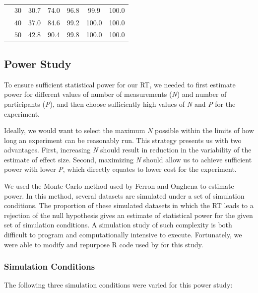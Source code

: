 \documentclass[empirical,issue, twocolumn,authordate]{jote-new-article}
\begin{document}
\begin{table}[t!]
\begin{fullwidth}
\begin{tabular}{@{}p{4\smallwidth} p{4\smallwidth} S  S  S  S  S @{}}
& $30$                                                             & 30.7      & 74.0     & 96.8     & 99.9      & 100.0     \\
& $40$                                                              & 37.0      & 84.6     & 99.2     & 100.0     & 100.0     \\
& $50$                                                              & 42.8      & 90.4     & 99.8     & 100.0     & 100.0  
\bottomrule
\end{tabular}
\end{fullwidth}

\end{table}
\subsection{Power Study}

To ensure sufficient statistical power for our RT, we needed to first estimate power for different values of number of measurements (\emph{N}) and number of participants (\emph{P}), and then choose sufficiently high values of \emph{N} and \emph{P} for the experiment. 

Ideally, we would want to select the maximum \emph{N} possible within the limits of how long an experiment can be reasonably run. This strategy presents us with two advantages. First, increasing \emph{N} should result in reduction in the variability of the estimate of effect size. Second, maximizing \emph{N} should allow us to achieve sufficient power with lower \emph{P}, which directly equates to lower cost for the experiment.

We used the Monte Carlo method used by Ferron and Onghena \parencite{Ferron1996} to estimate power. In this method, several datasets are simulated under a set of simulation conditions. The proportion of these simulated datasets in which the RT leads to a rejection of the null hypothesis gives an estimate of statistical power for the given set of simulation conditions. A simulation study of such complexity is both difficult to program and computationally intensive to execute. Fortunately, we were able to modify and repurpose R code used by \textcite{De2020} for this study. 

\subsubsection{Simulation Conditions}

The following three simulation conditions were varied for this power study:
\end{document}
